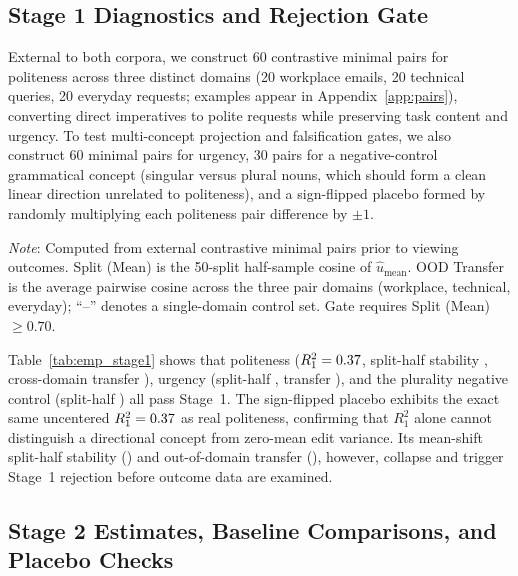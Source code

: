 \documentclass[11pt]{article}
\newcommand{\TableStyle}{\small\setlength{\tabcolsep}{5pt}\renewcommand{\arraystretch}{1.05}}
\begin{document}
\subsection{Stage 1 Diagnostics and Rejection Gate}

External to both corpora, we construct 60 contrastive minimal pairs for politeness across three distinct domains (20 workplace emails, 20 technical queries, 20 everyday requests; examples appear in Appendix~\ref{app:pairs}), converting direct imperatives to polite requests while preserving task content and urgency. To test multi-concept projection and falsification gates, we also construct 60 minimal pairs for urgency, 30 pairs for a negative-control grammatical concept (singular versus plural nouns, which should form a clean linear direction unrelated to politeness), and a sign-flipped placebo formed by randomly multiplying each politeness pair difference by $\pm 1$.

\begin{table}[htbp]
\centering\TableStyle
\caption{Empirical Stage 1 diagnostics on frozen \texttt{all-MiniLM-L6-v2} ($d = 384$).}
\label{tab:emp_stage1}
\begin{minipage}{0.95\linewidth}\footnotesize
\emph{Note}: Computed from external contrastive minimal pairs prior to viewing outcomes. Split (Mean) is the 50-split half-sample cosine of $\hat{u}_{\mathrm{mean}}$. OOD Transfer is the average pairwise cosine across the three pair domains (workplace, technical, everyday); ``--'' denotes a single-domain control set. Gate requires Split (Mean) $\ge 0.70$.
\end{minipage}
\end{table}

Table~\ref{tab:emp_stage1} shows that politeness ($R_1^2 = 0.37$, split-half stability \empPolSplit, cross-domain transfer \empPolOod), urgency (split-half \empUrgSplit, transfer \empUrgOod), and the plurality negative control (split-half \empPluSplit) all pass Stage~1. The sign-flipped placebo exhibits the exact same uncentered $R_1^2 = 0.37$ as real politeness, confirming that $R_1^2$ alone cannot distinguish a directional concept from zero-mean edit variance. Its mean-shift split-half stability (\empRndSplit) and out-of-domain transfer (\empRndOod), however, collapse and trigger Stage~1 rejection before outcome data are examined.

\subsection{Stage 2 Estimates, Baseline Comparisons, and Placebo Checks}
\end{document}
